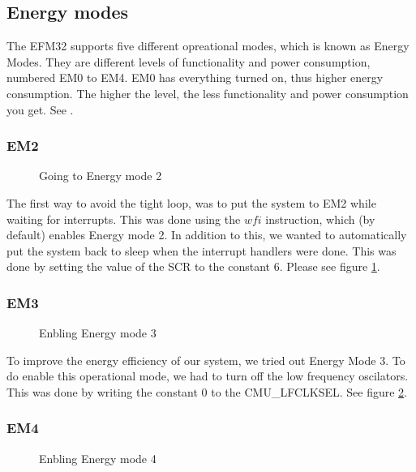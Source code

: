 	\subsection{Energy modes}
	The EFM32 supports five different opreational modes, which is known as Energy Modes. They are different levels of functionality and power consumption, numbered EM0 to EM4. EM0 has everything turned on, thus higher energy consumption. The higher the level, the less functionality and power consumption you get. See \cite[p. 2]{energy_optimization_application_note}.

	\subsubsection{EM2}
	\label{subsubsection:em2}
	
	\begin{figure}[h]
		
		\caption{Going to Energy mode 2}
		\label{code:wfi_scr}
	\end{figure}
	
	The first way to avoid the tight loop, was to put the system to EM2 while waiting for interrupts. This was done using the $wfi$ instruction, which (by default) enables Energy mode 2. In addition to this, we wanted to automatically put the system back to sleep when the interrupt handlers were done. This was done by setting the value of the SCR to the constant $6$. Please see figure \ref{code:wfi_scr}.

		\subsubsection{EM3}
		\label{subsubsection:em3}	
		\begin{figure}[h]
			
			\caption{Enbling Energy mode 3}
			\label{code:em3}
		\end{figure}

		To improve the energy efficiency of our system, we tried out Energy Mode 3. To do enable this operational mode, we had to turn off the low frequency oscilators. This was done by writing the constant $0$ to the CMU\_LFCLKSEL. See figure \ref{code:em3}.
	
		\subsubsection{EM4}
		\label{subsubsection:em4}
	
		\begin{figure}[h]
			
			\caption{Enbling Energy mode 4}
			\label{code:em4}
		\end{figure}

